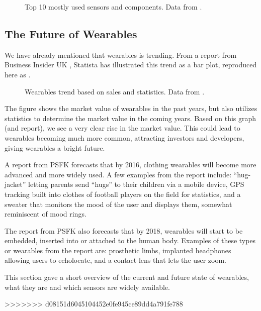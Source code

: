 \begin{figure}[!htb]
    \centering
    
    \caption{Top 10 mostly used sensors and components. Data from \protect\cite{LISTOFWEARABLES}.}
    \label{fig:wearables-sensors}
\end{figure}

\subsection{The Future of Wearables}
We have already mentioned that wearables is trending. 
From a report from Business Insider UK \cite{WEARABLESTREND}, 
Statista \cite{WEARABLESTRENDNUMBERS} has illustrated this trend as a bar plot, 
reproduced here as .

\begin{figure}[!htb]
  \centering
  
  \caption{Wearables trend based on sales and statistics. Data from \protect\cite{WEARABLESTRENDNUMBERS}.}
  \label{fig:wearables-trend}
\end{figure}

The figure shows the market value of wearables in the past years, 
but also utilizes statistics to determine the market value in the coming years. 
Based on this graph (and report), 
we see a very clear rise in the market value. 
This could lead to wearables becoming much more common,
attracting investors and developers, 
giving wearables a bright future. 

A report from PSFK \cite{PSFK} forecasts that by 2016, 
clothing wearables will become more advanced and more widely used. 
A few examples from the report include: 
``hug-jacket'' letting parents send ``hugs'' to their children via a mobile device, 
GPS tracking built into clothes of football players on the field for statistics, 
and a sweater that monitors the mood of the user and displays them, somewhat reminiscent of mood rings.

The report from PSFK also forecasts that by 2018, 
wearables will start to be embedded, \ie inserted into or attached to the human body. 
Examples of these types or wearables from the report are: 
prosthetic limbs, implanted headphones allowing users to echolocate, 
and a contact lens that lets the user zoom.

This section gave a short overview of the current and future state of wearables, 
what they are and which sensors are widely available. 

>>>>>>> d08151d6045104452e0fe945ce89dd4a791fe788

